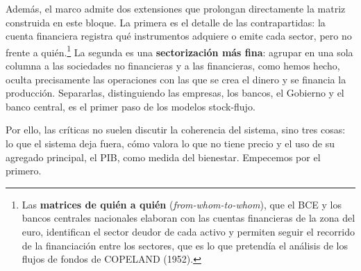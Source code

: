 \documentclass[10pt,a4paper]{article}
\begin{document}
Además, el marco admite dos extensiones que prolongan directamente la matriz construida en este bloque. La primera es el detalle de las contrapartidas: la cuenta financiera registra qué instrumentos adquiere o emite cada sector, pero no frente a quién.\footnote{%
  Las \textbf{matrices de quién a quién} (\textit{from-whom-to-whom}), que el BCE y los bancos centrales nacionales elaboran con las cuentas financieras de la zona del euro, identifican el sector deudor de cada activo y permiten seguir el recorrido de la financiación entre los sectores, que es lo que pretendía el análisis de los flujos de fondos de COPELAND (1952).
} La segunda es una \textbf{sectorización más fina}: agrupar en una sola columna a las sociedades no financieras y a las financieras, como hemos hecho, oculta precisamente las operaciones con las que se crea el dinero y se financia la producción. Separarlas, distinguiendo las empresas, los bancos, el Gobierno y el banco central, es el primer paso de los modelos stock-flujo.

Por ello, las críticas no suelen discutir la coherencia del sistema, sino tres cosas: lo que el sistema deja fuera, cómo valora lo que no tiene precio y el uso de su agregado principal, el PIB, como medida del bienestar. Empecemos por el primero.
\end{document}
